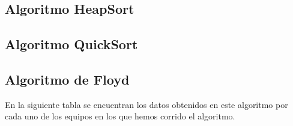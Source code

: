 \documentclass{homework}
\begin{document}
    \subsection{Algoritmo HeapSort}
    \subsection{Algoritmo QuickSort}
    
    \newpage 
    
    \subsection{Algoritmo de Floyd}

    En la siguiente tabla se encuentran los datos obtenidos en este algoritmo por cada uno de los
    equipos en los que hemos corrido el algoritmo. 
\end{document}
